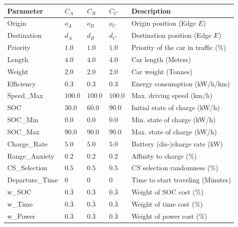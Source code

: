 \begin{table}[h]
	\renewcommand{\arraystretch}{1.3}
	\centering
	\begin{tabularx}{\columnwidth}{llllX}
		\hline
		\textbf{Parameter}          & \textbf{$C_{A}$} & \textbf{$C_{B}$}  & \textbf{$C_{C}$}           & \textbf{Description} \\ \hline
		Origin                      & $o_A$     & $o_B$ & $o_C$    & Origin position (Edge $E$)      \\
		Destination                 & $d_A$    & $d_B$  & $d_C$     & Destination position (Edge $E$) \\
		Priority                  & $1.0$ & $1.0$ & $1.0$ & Priority of the car in traffic (\%)                  \\
		Length                    & $4.0$ & $4.0$ & $4.0$ & Car length (Meters)            \\
		Weight                  & $2.0$ & $2.0$ & $2.0$ & Car weight  (Tonnes)                 \\
		Efficiency				& $0.3$ & $0.3$ & $0.3$ & Energy consumption (kW/h/km) \\
		Speed\_Max				& $100.0$ & $100.0$ & $100.0$ & Max. driving speed (km/h) \\
		SOC                      & $30.0$ & $60.0$ & $90.0$ & Initial state of charge (kW/h)                   \\
		SOC\_Min               & $0.0$ & $0.0$ & $0.0$ & Min. state of charge (kW/h)                     \\
		SOC\_Max              & $90.0$ & $90.0$ & $90.0$ & Max. state of charge (kW/h)                      \\
		Charge\_Rate          & $5.0$ & $5.0$ & $5.0$ & Battery (dis-)charge rate (kW)                    \\
		Range\_Anxiety         & $0.2$ & $0.2$ & $0.2$ & Affinity to charge (\%)                     \\
		CS\_Selection		   & $0.5$ & $0.5$ & $0.5$ & $CS$ selection randomness (\%)                    \\ 
		Departure\_Time 	& $0$ & $0$ & $0$ & Time to start traveling (Minutes)                   \\
		w\_SOC              & $0.\overline{3}$  & $0.\overline{3}$ & $0.\overline{3}$ & Weight of SOC cost (\%)                   \\
		w\_Time              & $0.\overline{3}$ & $0.\overline{3}$ & $0.\overline{3}$ & Weight of time cost (\%)                     \\
		w\_Power             & $0.\overline{3}$ & $0.\overline{3}$ & $0.\overline{3}$ & Weight of power cost (\%)                      \\ \hline
	\end{tabularx}
\end{table}

